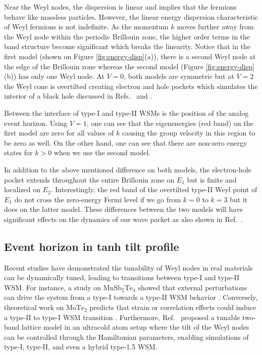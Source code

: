 \documentclass[%
 aip,
 amsmath,amssymb,
 reprint,%
]{revtex4-1}
\begin{document}
Near the Weyl nodes, the dispersion is linear and implies that the fermions behave like massless particles. However, the linear energy dispersion characteristic of Weyl fermions is not indefinite. As the momentum $k$ moves further away from the Weyl node within the periodic Brillouin zone, the higher order terms in the band structure become significant which breaks the linearity. Notice that in the first model (shown on Figure \ref{fig:energy-disp}(a)), there is a second Weyl node at the edge of the Brillouin zone whereas the second model (Figure \ref{fig:energy-disp}(b)) has only one Weyl node. At $V=0$, both models are symmetric but at $V=2$ the Weyl cone is overtilted creating electron and hole pockets which simulates the interior of a black hole discussed in Refs.~ and . 

Between the interface of type-I and type-II WSMs is the position of the analog event horizon. Using $V=1$, one can see that the eigenenergies (red band) on the first model are zero for all values of $k$ causing the group velocity in this region to be zero as well. On the other hand, one can see that there are non-zero energy states for $k>0$ when we use the second model.

In addition to the above mentioned difference on both models, the electron-hole pocket extends throughout the entire Brillouin zone on $E_1$ but is finite and localized on $E_2$. Interestingly, the red band of the overtilted type-II Weyl point of $E_1$ do not cross the zero-energy Fermi level if we go from $k=0$ to $k=3$ but it does on the latter model. These differences between the two models will have significant effects on the dynamics of our wave packet as also shown in Ref.~.

\subsection{Event horizon in tanh tilt profile}

Recent studies have demonstrated the tunability of Weyl nodes in real materials can be dynamically tuned, leading to transitions between type-I and type-II WSM. For instance, a study on $\mathrm{MnSb_2Te_4}$ showed that external perturbations can drive the system from a type-I towards a type-II WSM behavior \cite{tamanna2024}. Conversely, theoretical work on $\mathrm{MoTe_2}$ predicts that strain or correlation effects could induce a type-II to type-I WSM transition \cite{sun2015}. Furthermore, Ref.~ proposed a tunable two-band lattice model in an ultracold atom setup where the tilt of the Weyl nodes can be controlled through the Hamiltonian parameters, enabling simulations of type-I, type-II, and even a hybrid type-1.5 WSM.
\end{document}
